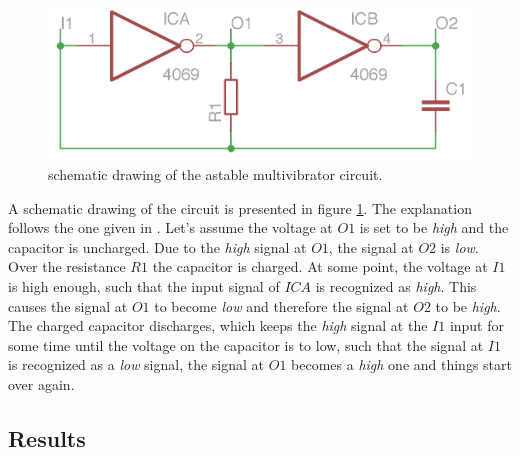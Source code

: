 \documentclass[journal]{IEEEtran}
\begin{document}
\begin{figure}[h!]
  \centering
   \includegraphics[]{boards/am_overview.png}
   \caption{schematic drawing of the astable multivibrator circuit.}
   \label{fig:am_scheme}
\end{figure}

A schematic drawing of the circuit is presented in figure \ref{fig:am_scheme}.
The explanation follows the one given in \cite{book_dg}. Let's assume the
voltage at $O1$ is set to be \emph{high} and the capacitor is uncharged. Due to
the \emph{high} signal at $O1$, the signal at $O2$ is \emph{low}. Over the
resistance $R1$ the capacitor is charged. At some point, the voltage at $I1$ is high enough, such
that the input signal of $ICA$ is recognized as \emph{high}. This causes the
signal at $O1$ to become \emph{low} and therefore the signal at $O2$ to be
\emph{high}. The charged capacitor discharges, which keeps the \emph{high}
signal at the $I1$ input for some time until the voltage on the capacitor is to
low, such that the signal at $I1$ is recognized as a \emph{low} signal, the
signal at $O1$ becomes a \emph{high} one and things start over again.

\subsection{Results}
\end{document}
